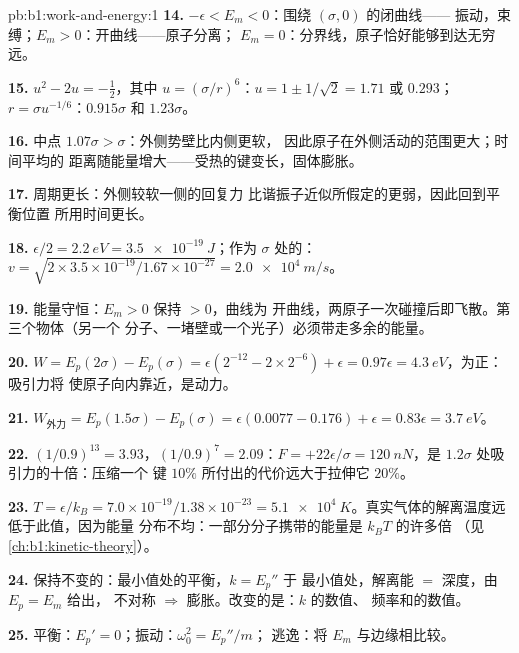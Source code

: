 \begin{solution}{pb:b1:work-and-energy:1}
\textbf{14.} $-\epsilon < E_m < 0$：围绕 $(\sigma, 0)$ 的闭曲线——
振动，束缚；$E_m > 0$：开曲线——原子分离；
$E_m = 0$：分界线，原子恰好能够到达无穷远。

\textbf{15.} $u^2 - 2u = -\tfrac12$，其中 $u = (\sigma/r)^6$：$u = 1 \pm 1/\sqrt2
= 1.71$ 或 $0.293$；$r = \sigma u^{-1/6}$：$0.915\sigma$ 和 $1.23\sigma$。

\textbf{16.} 中点 $1.07\sigma > \sigma$：外侧势壁比内侧更软，
因此原子在外侧活动的范围更大；时间平均的
距离随能量增大——受热的键变长，固体膨胀。

\textbf{17.} 周期更长：外侧较软一侧的回复力
比谐振子近似所假定的更弱，因此回到平衡位置
所用时间更长。

\textbf{18.} $\epsilon/2 = \qty{2.2}{eV} = \qty{3.5e-19}{J}$；作为
$\sigma$ 处的：$v = \sqrt{2 \times 3.5\times10^{-19}/1.67\times10^{-27}}
= \qty{2.0e4}{m/s}$。

\textbf{19.} 能量守恒：$E_m > 0$ 保持 $> 0$，曲线为
开曲线，两原子一次碰撞后即飞散。第三个物体（另一个
分子、一堵壁或一个光子）必须带走多余的能量。

\textbf{20.} $W = E_p(2\sigma) - E_p(\sigma) = \epsilon(2^{-12} - 2 \times 2^{-6})
+ \epsilon = 0.97\epsilon = \qty{4.3}{eV}$，为正：吸引力将
使原子向内靠近，是动力。

\textbf{21.} $W_{\text{外力}} = E_p(1.5\sigma) - E_p(\sigma) = \epsilon(0.0077 -
0.176) + \epsilon = 0.83\epsilon = \qty{3.7}{eV}$。

\textbf{22.} $(1/0.9)^{13} = 3.93$，$(1/0.9)^7 = 2.09$：$F = +22\epsilon/\sigma
= \qty{+120}{nN}$，是 $1.2\sigma$ 处吸引力的十倍：压缩一个
键 $10\%$ 所付出的代价远大于拉伸它 $20\%$。

\textbf{23.} $T = \epsilon/k_B = 7.0\times10^{-19}/1.38\times10^{-23} =
\qty{5.1e4}{K}$。真实气体的解离温度远低于此值，因为能量
分布不均：一部分分子携带的能量是 $k_BT$ 的许多倍
（见\cref{ch:b1:kinetic-theory}）。

\textbf{24.} 保持不变的：最小值处的平衡，$k = E_p''$ 于
最小值处，解离能 $=$ 深度，由 $E_p = E_m$ 给出，
不对称 $\Rightarrow$ 膨胀。改变的是：$k$ 的数值、
频率和的数值。

\textbf{25.} 平衡：$E_p' = 0$；振动：$\omega_0^2 = E_p''/m$；
逃逸：将 $E_m$ 与边缘相比较。
\end{solution}

